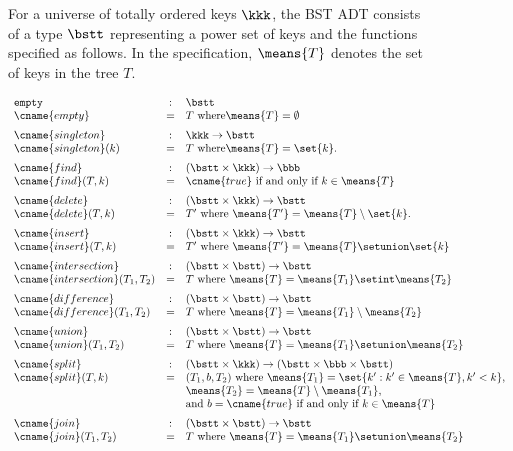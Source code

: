 \begin{figure}
\begin{datatype}[\bf BST]
\label{adt:bst::adt}
\normalsize For a universe of totally ordered keys $\kkk$, the BST ADT
consists of a type $\bstt$ representing a power set of keys and the
functions specified as follows. In the specification, $\means{T}$
denotes the set of keys in the tree $T$.

\[
\begin{array}{lcl}
\texttt{empty} & : &\bstt
\\
\cname{empty} & = & T~\mbox{where} \means{T} = \emptyset
\\[2mm]
%
\cname{singleton} & : & \kkk \rightarrow \bstt
\\
\cname{singleton} (k) & = & T ~\mbox{where} \means{T} = \set{k}.
\\[2mm]
%
\cname{find}
& : & (\bstt \times \kkk) \rightarrow \bbb
\\
\cname{find} (T,k) 
& = &  
\cname{true}~\mbox{if and only if}~k \in \means{T}
\\[2mm]
%
\cname{delete}
& : & (\bstt \times \kkk) \rightarrow  \bstt
\\
\cname{delete} (T,k)
& = &  T' ~\mbox{where}~ \means{T'} = \means{T} \setminus \set{k}.
\\[2mm]
\cname{insert}
& : & (\bstt \times \kkk) \rightarrow  \bstt
\\
\cname{insert} (T,k) 
& = & T'~\mbox{where}~\means{T'} = \means{T} \setunion \set{k}
\\[2mm]
%
\cname{intersection}
& : & (\bstt \times \bstt) \rightarrow  \bstt
\\
\cname{intersection} (T_1,T_2)
& = & 
T ~\mbox{where}~ \means{T} = \means{T_1} \setint \means{T_2}
\\[2mm]
%
\cname{difference}
& : & (\bstt \times \bstt) \rightarrow  \bstt
\\
\cname{difference} (T_1,T_2)
& = & 
T ~\mbox{where}~ \means{T} = \means{T_1} \setminus \means{T_2}
\\[2mm]
%
\cname{union}
& : & (\bstt \times \bstt) \rightarrow  \bstt
\\
\cname{union} (T_1,T_2)
& = & 
T ~\mbox{where}~\means{T} = \means{T_1} \setunion \means{T_2}
\\[2mm]
%
\cname{split}
& : & (\bstt \times \kkk) \rightarrow (\bstt \times \bbb \times \bstt)
\\
\cname{split} (T,k)
& = & 
(T_1, b, T_2) ~\mbox{where}~ 
\means{T_1} = \set{k': k' \in \means{T}, k' < k},
\\
& & 
\means{T_2} = \means{T} \setminus \means{T_1}, 
\\
& & 
\mbox{and}~b = \cname{true}~\mbox{if and only if}~k \in \means{T} 
\\[2mm]
\cname{join}
& : & (\bstt \times \bstt) \rightarrow \bstt 
\\
\cname{join} (T_1,T_2)
& = &  
T ~\mbox{where}~ \means{T} =
\means{T_1} \setunion \means{T_2}
\end{array}
\]
\end{datatype}
\end{figure}
